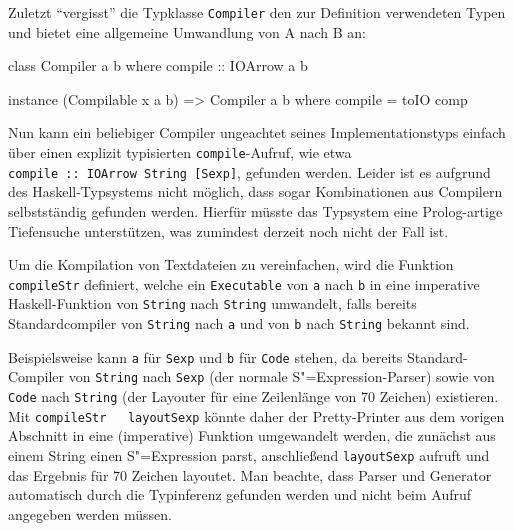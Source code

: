 \documentclass[12pt, a4paper, bibgerm]{scrbook}
\newenvironment{DIFnomarkup}{}{}
\newcommand\icode[1]{\lstinline?#1?}
\newcommand{\sexp}{S"=Expression}
\begin{document}
Zuletzt "`vergisst"' die Typklasse \icode{Compiler} den zur Definition
verwendeten Typen und bietet eine allgemeine Umwandlung von A nach B an:
\begin{DIFnomarkup}\begin{code}
class Compiler a b where
  compile :: IOArrow a b

instance (Compilable x a b) => Compiler a b where
  compile = toIO comp
\end{code}\end{DIFnomarkup}
Nun kann ein beliebiger Compiler ungeachtet seines Implementationstyps
einfach über einen explizit typisierten \icode{compile}-Aufruf, wie etwa
\\\icode{compile :: IOArrow String [Sexp]}, gefunden werden. Leider ist
es aufgrund des Haskell-Typsystems nicht möglich, dass sogar
Kombinationen aus Compilern selbstständig gefunden werden. Hierfür
müsste das Typsystem eine Prolog-artige Tiefensuche unterstützen, was
zumindest derzeit noch nicht der Fall ist. 

Um die Kompilation von Textdateien zu vereinfachen, wird die Funktion
\icode{compileStr} definiert, welche ein \icode{Executable} von
\icode{a} nach \icode{b} in eine imperative Haskell-Funktion von
\icode{String} nach \icode{String} umwandelt, falls bereits
Standardcompiler von \icode{String} nach \icode{a} und von \icode{b}
nach \icode{String} bekannt sind.   
\begin{DIFnomarkup}\end{DIFnomarkup} %
Beispielsweise kann \icode{a} für
\icode{Sexp} und \icode{b} für \icode{Code} stehen, da bereits
Standard-Compiler von \icode{String} nach \icode{Sexp} (der normale
\sexp{}-Parser) sowie von \icode{Code} nach \icode{String} (der Layouter
für eine Zeilenlänge von 70 Zeichen) existieren. Mit \icode{compileStr
  layoutSexp} könnte daher der Pretty-Printer aus dem vorigen
Abschnitt in eine (imperative) Funktion umgewandelt werden, die zunächst
aus einem String einen \sexp{} parst, anschließend \icode{layoutSexp} aufruft
und das Ergebnis für 70 Zeichen layoutet. Man beachte, dass Parser und
Generator automatisch durch die Typinferenz gefunden werden und nicht
beim Aufruf angegeben werden müssen.
\end{document}
